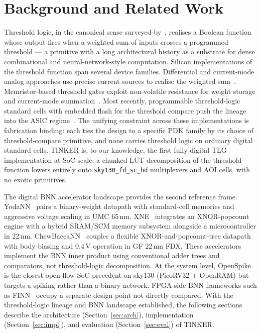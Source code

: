 \documentclass[conference]{IEEEtran}
\begin{document}
\section{Background and Related Work}
\label{sec:background}

Threshold logic, in the canonical sense surveyed
by~\cite{beiu2003vlsi}, realises a Boolean function whose output
fires when a weighted sum of inputs crosses a programmed threshold
--- a primitive with a long architectural history as a substrate
for dense combinational and neural-network-style computation.
Silicon implementations of the threshold function span several
device families. Differential and current-mode analog approaches
use precise current sources to realise the weighted
sum~\cite{beiu2003differential}. Memristor-based threshold gates
exploit non-volatile resistance for weight storage and
current-mode summation~\cite{papandroulidakis2019practical}.
Most recently, programmable threshold-logic standard cells with
embedded flash for the threshold compare push the lineage into
the ASIC regime~\cite{tulip}. The unifying constraint across these
implementations is fabrication binding: each ties the design to a
specific PDK family by its choice of threshold-compare primitive,
and none carries threshold logic on ordinary digital standard
cells. TINKER is, to our knowledge, the first fully-digital TLG
implementation at SoC scale: a chunked-LUT decomposition of the
threshold function lowers entirely onto
\texttt{sky130\_fd\_sc\_hd} multiplexers and AOI cells, with no
exotic primitives.

The digital BNN accelerator landscape provides the second
reference frame. YodaNN~\cite{yodann2018} pairs a binary-weight
datapath with standard-cell memories and aggressive voltage
scaling in UMC 65\,nm. XNE~\cite{xne2018} integrates an
XNOR-popcount engine with a hybrid SRAM/SCM memory subsystem
alongside a microcontroller in 22\,nm.
ChewBaccaNN~\cite{chewbaccann2021} couples a flexible
XNOR-and-popcount-tree datapath with body-biasing and 0.4\,V
operation in GF 22\,nm FDX. These accelerators implement the BNN
inner product using conventional adder trees and comparators,
not threshold-logic decomposition. At the system level,
OpenSpike~\cite{openspike} is the closest open-flow SoC
precedent on sky130 (PicoRV32 + OpenRAM) but targets a spiking
rather than a binary network. FPGA-side BNN frameworks such as
FINN~\cite{finn} occupy a separate design point not directly
compared. With the threshold-logic lineage and BNN landscape
established, the following sections describe the architecture
(Section~\ref{sec:arch}), implementation (Section~\ref{sec:impl}),
and evaluation (Section~\ref{sec:eval}) of TINKER.
\end{document}
